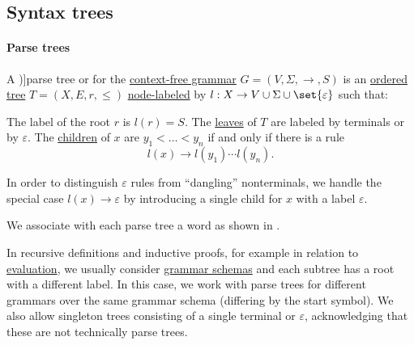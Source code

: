 \subsection{Syntax trees}\label{subsec:syntax_trees}

\paragraph{Parse trees}

\begin{definition}\label{def:parse_tree}
  A \term[ru=дерево вывода (\cite[81]{Гладкий1973Языки})]{parse tree} or  for the \hyperref[def:chomsky_hierarchy/context_free]{context-free grammar} \( G = (V, \Sigma, \to, S) \) is an \hyperref[def:ordered_tree]{ordered tree} \( T = (X, E, r, \leq) \) \hyperref[def:labeled_set]{node-labeled} by \( l: X \to V \cup \Sigma \cup \set{ \varepsilon } \) such that:
  \begin{thmenum}
     The label of the root \( r \) is \( l(r) = S \).
     The \hyperref[def:rooted_tree/leaf]{leaves} of \( T \) are labeled by terminals or by \( \varepsilon \).
     The \hyperref[def:rooted_tree/parent_child]{children} of \( x \) are \( y_1 < \ldots < y_n \) if and only if there is a rule
    \begin{equation*}
      l(x) \to l(y_1) \cdots l(y_n).
    \end{equation*}

    In order to distinguish \( \varepsilon \) rules from \enquote{dangling} nonterminals, we handle the special case \( l(x) \to \varepsilon \) by introducing a single child for \( x \) with a label \( \varepsilon \).
  \end{thmenum}
\end{definition}
\begin{comments}
  \item We associate with each parse tree a word as shown in .
\end{comments}

\begin{remark}\label{rem:parse_tree_roots}
  In recursive definitions and inductive proofs, for example in relation to \hyperref[rem:evaluation]{evaluation}, we usually consider \hyperref[def:formal_grammar/schema]{grammar schemas} and each subtree has a root with a different label. In this case, we work with parse trees for different grammars over the same grammar schema (differing by the start symbol). We also allow singleton trees consisting of a single terminal or \( \varepsilon \), acknowledging that these are not technically parse trees.
\end{remark}

